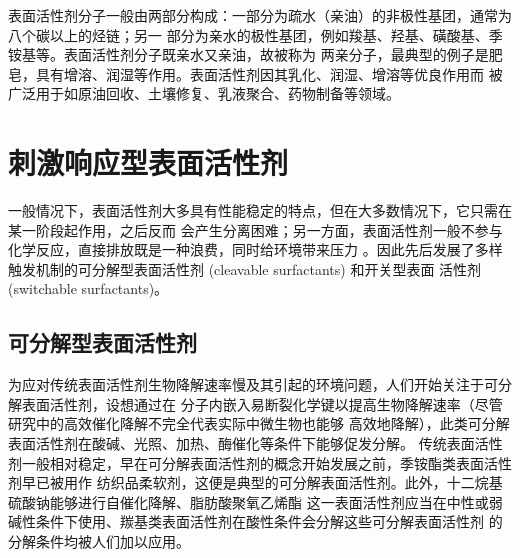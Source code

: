 \documentclass[bachelor,fandolfonts,replaceperiod]{jnuthesis}
\begin{document}
    表面活性剂分子一般由两部分构成：一部分为疏水（亲油）的非极性基团，通常为八个碳以上的烃链；另一
    部分为亲水的极性基团，例如羧基、羟基、磺酸基、季铵基等。表面活性剂分子既亲水又亲油，故被称为
    两亲分子，最典型的例子是肥皂，具有增溶、润湿等作用。表面活性剂因其乳化、润湿、增溶等优良作用而
    被广泛用于如原油回收、土壤修复、乳液聚合、药物制备等领域\cite{秦勇2009}。
    
    \section{刺激响应型表面活性剂}
    一般情况下，表面活性剂大多具有性能稳定的特点，但在大多数情况下，它只需在某一阶段起作用，之后反而
    会产生分离困难；另一方面，表面活性剂一般不参与化学反应，直接排放既是一种浪费，同时给环境带来压力
    \cite{秦勇2009}。因此先后发展了多样触发机制的可分解型表面活性剂 (cleavable surfactants) 和开关型表面
    活性剂 (switchable surfactants)。
    
    \subsection{可分解型表面活性剂}
    为应对传统表面活性剂生物降解速率慢及其引起的环境问题，人们开始关注于可分解表面活性剂，设想通过在
    分子内嵌入易断裂化学键以提高生物降解速率（尽管研究中的高效催化降解不完全代表实际中微生物也能够
    高效地降解）\cite{tehrani2007}，此类可分解表面活性剂在酸碱、光照、加热、酶催化等条件下能够促发分解\cite{hellberg2000}。
    传统表面活性剂一般相对稳定，早在可分解表面活性剂的概念开始发展之前，季铵酯类表面活性剂早已被用作
    纺织品柔软剂，这便是典型的可分解表面活性剂。此外，十二烷基硫酸钠能够进行自催化降解、脂肪酸聚氧乙烯酯
    这一表面活性剂应当在中性或弱碱性条件下使用、羰基类表面活性剂在酸性条件会分解这些可分解表面活性剂
    的分解条件均被人们加以应用\cite{tehrani2007}。
    
\end{document}
